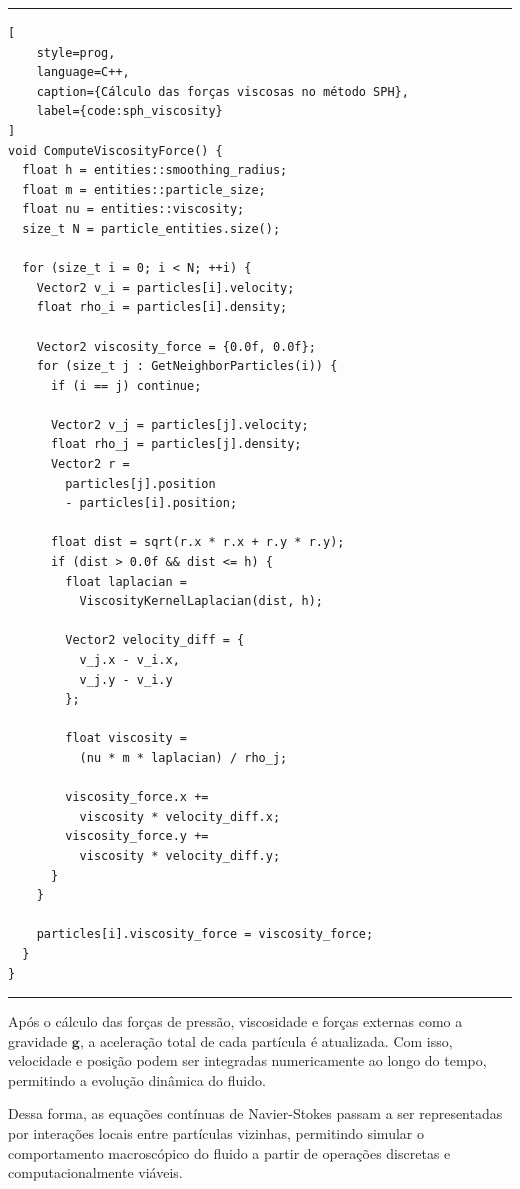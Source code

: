 \hfill
\hrule
\begin{lstlisting}[
    style=prog,
    language=C++,
    caption={Cálculo das forças viscosas no método SPH},
    label={code:sph_viscosity}
]
void ComputeViscosityForce() {
  float h = entities::smoothing_radius;
  float m = entities::particle_size;
  float nu = entities::viscosity;
  size_t N = particle_entities.size();

  for (size_t i = 0; i < N; ++i) {
    Vector2 v_i = particles[i].velocity;
    float rho_i = particles[i].density;

    Vector2 viscosity_force = {0.0f, 0.0f};
    for (size_t j : GetNeighborParticles(i)) {
      if (i == j) continue;

      Vector2 v_j = particles[j].velocity;
      float rho_j = particles[j].density;
      Vector2 r =
        particles[j].position
        - particles[i].position;

      float dist = sqrt(r.x * r.x + r.y * r.y);
      if (dist > 0.0f && dist <= h) {
        float laplacian =
          ViscosityKernelLaplacian(dist, h);

        Vector2 velocity_diff = {
          v_j.x - v_i.x,
          v_j.y - v_i.y
        };

        float viscosity =
          (nu * m * laplacian) / rho_j;

        viscosity_force.x +=
          viscosity * velocity_diff.x;
        viscosity_force.y +=
          viscosity * velocity_diff.y;
      }
    }

    particles[i].viscosity_force = viscosity_force;
  }
}
\end{lstlisting}
\hrule

Após o cálculo das forças de pressão, viscosidade e forças externas como a
gravidade \(\mathbf{g}\), a aceleração total de cada partícula é atualizada.
Com isso, velocidade e posição podem ser integradas numericamente ao longo do
tempo, permitindo a evolução dinâmica do fluido.

Dessa forma, as equações contínuas de Navier-Stokes passam a ser representadas
por interações locais entre partículas vizinhas, permitindo simular o
comportamento macroscópico do fluido a partir de operações discretas e
computacionalmente viáveis.

